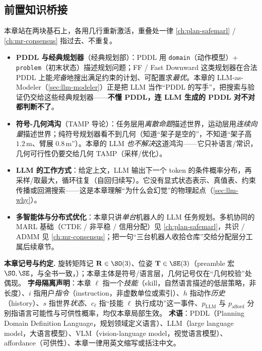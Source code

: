 \subsection*{前置知识桥接}
本章站在两块基石上，各用几行重新激活，重叠处一律 \cref{ch:plan-safemarl} / \cref{ch:mr-consensus} 指过去、不重复。

\begin{itemize}
  \item \textbf{PDDL 与经典规划器}（经典规划部）：PDDL 用 \texttt{domain}（动作模型）+ \texttt{problem}（初末状态）描述规划问题；FF / Fast Downward 这类规划器在合法 PDDL 上能\emph{完备}地搜出满足约束的计划、可配置求\emph{最优}。本章的 LLM-as-Modeler（\cref{sec:llm-modeler}）正是把 LLM 当作“PDDL 的写手”，把搜索与验证仍交给这些经典规划器——\textbf{不懂 PDDL，连 LLM 生成的 PDDL 对不对都判断不了}。
  \item \textbf{符号-几何鸿沟}（TAMP 导论）：任务层用\emph{离散命题}描述世界，运动层用\emph{连续向量}描述世界；纯符号规划器看不到几何（知道“架子是空的”，不知道“架子高 $1.2\,$m、臂展 $0.8\,$m”）。本章的 LLM \emph{也不解决}这道鸿沟——它只补语言/常识，几何可行性仍要交给几何 TAMP（采样/优化）。
  \item \textbf{LLM 的工作方式}：给定上文，LLM 输出下一个 token 的条件概率分布，再采样/取最大，循环往复（自回归续写）。它没有显式状态表示、真值表、约束传播或回溯搜索——这是本章理解“为什么会幻觉”的物理起点（\cref{sec:llm-why}）。
  \item \textbf{多智能体与分布式优化}：本章只讲\emph{单台}机器人的 LLM 任务规划。多机协同的 MARL 基础（CTDE / 非平稳 / 信用分配）见 \cref{ch:plan-safemarl}，共识 / ADMM 见 \cref{ch:mr-consensus}；把一句“三台机器人收拾仓库”交给分配层分工属后续章节。
\end{itemize}

\begin{note}
\textbf{本章记号与约定.}\;
旋转矩阵记 $\mathbf{R}\in\SO(3)$、位姿 $\mathbf{T}\in\SE(3)$（preamble 宏 $\SO,\SE$，与全书一致，）；本章主体是符号/语言层，几何记号仅在“几何校验”处偶现。
\textbf{字母隔离声明}：本章 $\ell$ 指一个\emph{技能}（skill，自然语言描述的低层策略，非长度）、$i$ 指用户\emph{指令}（instruction，非虚数单位或索引）、$h$ 指动作\emph{历史}（history）、$s$ 指世界\emph{状态}、$c_\ell$ 指“技能 $\ell$ 执行成功”这一事件、$p_{\text{LLM}}$ 与 $p_{\text{afford}}$ 分别指语言可能性与可供性概率，均仅本章局部生效。
\textbf{术语}：PDDL（Planning Domain Definition Language，规划领域定义语言）、LLM（large language model，大语言模型）、VLM（vision-language model，视觉语言模型）、affordance（可供性）、本章一律用英文缩写或括注中文。
\end{note}

